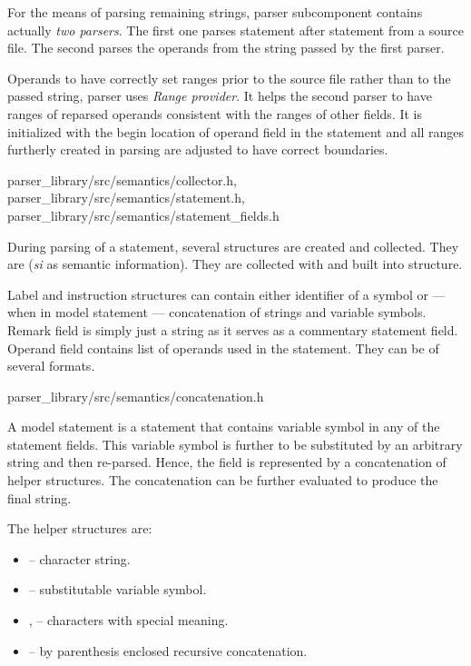 For the means of parsing remaining strings, parser subcomponent contains actually \emph{two parsers}. The first one parses statement after statement from a source file. The second parses the operands from the string passed by the first parser. 

Operands to have correctly set ranges prior to the source file rather than to the passed string, parser uses \emph{Range provider}. It helps the second parser to have ranges of reparsed operands consistent with the ranges of other fields. It is initialized with the begin location of operand field in the statement and all ranges furtherly created in parsing are adjusted to have correct boundaries.

{parser\_library/src/semantics/collector.h,
parser\_library/src/semantics/statement.h,
parser\_library/src/semantics/statement\_fields.h}

During parsing of a statement, several structures are created and collected. They are  (\emph{si} as semantic information). They are collected with  and built into  structure.

Label and instruction structures can contain either identifier of a symbol or --- when in model statement --- concatenation of strings and variable symbols. Remark field is simply just a string as it serves as a commentary statement field. Operand field contains list of operands used in the statement. They can be of several formats.

{parser\_library/src/semantics/concatenation.h}

A model statement is a statement that contains variable symbol in any of the statement fields. This variable symbol is further to be substituted by an arbitrary string and then re-parsed. Hence, the field is represented by a concatenation of helper structures. The concatenation can be further evaluated to produce the final string.

The helper structures are:
\begin{itemize}
	\item {} -- character string.
	\item {} -- substitutable variable symbol.
	\item {},  -- characters with special meaning.
	\item {} -- by parenthesis enclosed recursive concatenation.
\end{itemize}

